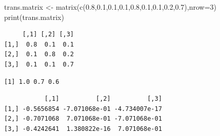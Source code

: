 \documentclass[
  letterpaper,
  DIV=11,
  numbers=noendperiod]{scrreprt}
\newenvironment{Shaded}{\begin{snugshade}}{\end{snugshade}}
\newcommand{\AttributeTok}[1]{\textcolor[rgb]{0.40,0.45,0.13}{#1}}
\newcommand{\DecValTok}[1]{\textcolor[rgb]{0.68,0.00,0.00}{#1}}
\newcommand{\FloatTok}[1]{\textcolor[rgb]{0.68,0.00,0.00}{#1}}
\newcommand{\FunctionTok}[1]{\textcolor[rgb]{0.28,0.35,0.67}{#1}}
\newcommand{\NormalTok}[1]{\textcolor[rgb]{0.00,0.23,0.31}{#1}}
\newcommand{\OtherTok}[1]{\textcolor[rgb]{0.00,0.23,0.31}{#1}}
\newcommand{\SpecialCharTok}[1]{\textcolor[rgb]{0.37,0.37,0.37}{#1}}
\begin{document}
\begin{Shaded}
\begin{Highlighting}[]
\NormalTok{trans.matrix }\OtherTok{\textless{}{-}} \FunctionTok{matrix}\NormalTok{(}\FunctionTok{c}\NormalTok{(}\FloatTok{0.8}\NormalTok{,}\FloatTok{0.1}\NormalTok{,}\FloatTok{0.1}\NormalTok{,}\FloatTok{0.1}\NormalTok{,}\FloatTok{0.8}\NormalTok{,}\FloatTok{0.1}\NormalTok{,}\FloatTok{0.1}\NormalTok{,}\FloatTok{0.2}\NormalTok{,}\FloatTok{0.7}\NormalTok{),}\AttributeTok{nrow=}\DecValTok{3}\NormalTok{)}
\FunctionTok{print}\NormalTok{(trans.matrix)}
\end{Highlighting}
\end{Shaded}

\begin{verbatim}
     [,1] [,2] [,3]
[1,]  0.8  0.1  0.1
[2,]  0.1  0.8  0.2
[3,]  0.1  0.1  0.7
\end{verbatim}

\begin{Shaded}
\end{Shaded}

\begin{verbatim}
[1] 1.0 0.7 0.6
\end{verbatim}

\begin{Shaded}
\end{Shaded}

\begin{verbatim}
           [,1]          [,2]          [,3]
[1,] -0.5656854 -7.071068e-01 -4.734007e-17
[2,] -0.7071068  7.071068e-01 -7.071068e-01
[3,] -0.4242641  1.380822e-16  7.071068e-01
\end{verbatim}

\begin{Shaded}
\end{Shaded}
\end{document}
